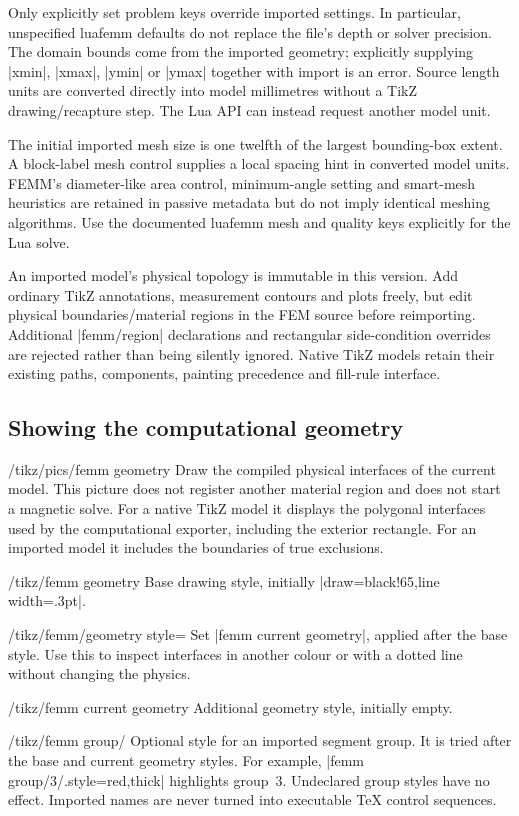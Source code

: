 Only explicitly set problem keys override imported settings. In particular,
unspecified luafemm defaults do not replace the file's depth or solver precision.
The domain bounds come from the imported geometry; explicitly supplying |xmin|,
|xmax|, |ymin| or |ymax| together with import is an error. Source length units are
converted directly into model millimetres without a TikZ drawing/recapture step.
The Lua API can instead request another model unit.

The initial imported mesh size is one twelfth of the largest bounding-box extent.
A block-label mesh control supplies a local spacing hint in converted model units.
FEMM's diameter-like area control, minimum-angle setting and smart-mesh heuristics
are retained in passive metadata but do not imply identical meshing algorithms.
Use the documented luafemm mesh and quality keys explicitly for the Lua solve.

An imported model's physical topology is immutable in this version. Add ordinary
TikZ annotations, measurement contours and plots freely, but edit physical
boundaries/material regions in the FEM source before reimporting. Additional
|femm/region| declarations and rectangular side-condition overrides are rejected
rather than being silently ignored. Native TikZ models retain their existing
paths, components, painting precedence and fill-rule interface.

\subsection{Showing the computational geometry}

\begin{key}{/tikz/pics/femm geometry}
Draw the compiled physical interfaces of the current model. This picture does
not register another material region and does not start a magnetic solve.
For a native TikZ model it displays the polygonal interfaces used by the
computational exporter, including the exterior rectangle. For an imported model
it includes the boundaries of true exclusions.
\end{key}
\begin{stylekey}{/tikz/femm geometry}
Base drawing style, initially |draw=black!65,line width=.3pt|.
\end{stylekey}
\begin{key}{/tikz/femm/geometry style=}
Set |femm current geometry|, applied after the base style. Use this to inspect
interfaces in another colour or with a dotted line without changing the physics.
\end{key}
\begin{stylekey}{/tikz/femm current geometry}
Additional geometry style, initially empty.
\end{stylekey}
\begin{stylekey}{/tikz/femm group/}
Optional style for an imported segment group. It is tried after the base and
current geometry styles. For example, |femm group/3/.style={red,thick}| highlights
group~3. Undeclared group styles have no effect. Imported names are never turned
into executable TeX control sequences.
\end{stylekey}

